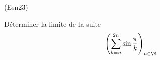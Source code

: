 \begin{tiny}(Esn23)\end{tiny} Déterminer la limite de la suite 
\begin{displaymath}
 \left( \sum_{k = n}^{2n} \sin \frac{\pi}{k} \right)_{n \in \N}
\end{displaymath}

